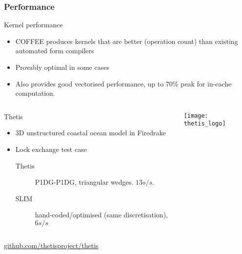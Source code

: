 \documentclass[presentation]{beamer}
\newcommand{\arxivlink}[2]{%
  \href{http://www.arxiv.org/abs/#1}%
  {{\small\texttt{arXiv:\,#1\,[#2]}}}%
}
\begin{document}
\begin{frame}[allowframebreaks]
  \frametitle{Performance}

  \begin{block}{Kernel performance}
    \begin{itemize}
    \item COFFEE produces kernels that are better (operation count)
      than existing automated form compilers
    \item Provably optimal in some cases
    \item Also provides good vectorised performance, up to 70\% peak
      for in-cache computation.
    \end{itemize}
  \end{block}



\pagebreak

  \begin{columns}
    \begin{column}{0.7\textwidth}
      \begin{block}{Thetis}
        \begin{itemize}
        \item 3D unstructured coastal ocean model in Firedrake
        \item Lock exchange test case
          \begin{description}
          \item[Thetis] P1DG-P1DG, triangular wedges.  $13s/s$.
          \item[SLIM] hand-coded/optimised (same discretisation),
            $6s/s$
          \end{description}
        \end{itemize}
      \end{block}
    \end{column}
    \begin{column}[t]{0.3\textwidth}
      \texttt{[image: thetis\_logo]}
    \end{column}
  \end{columns}
  \begin{center}
    \url{github.com/thetisproject/thetis}    
  \end{center}
\end{frame}
\end{document}

